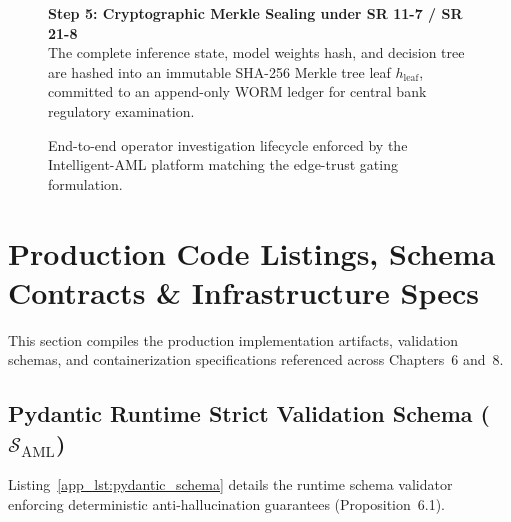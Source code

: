 \begin{figure}[htbp]
{\begin{minipage}{0.95\textwidth}
\vspace{0.25cm}
\textbf{\textcolor{blue!70!black}{Step 5: Cryptographic Merkle Sealing under SR 11-7 / SR 21-8}} \\
The complete inference state, model weights hash, and decision tree are hashed into an immutable SHA-256 Merkle tree leaf $h_{\text{leaf}}$, committed to an append-only WORM ledger for central bank regulatory examination.\par
\end{minipage}%
}
\caption[End-to-End Enterprise Operator Investigation Lifecycle]{End-to-end operator investigation lifecycle enforced by the Intelligent-AML platform matching the edge-trust gating formulation.}
\label{app_fig:workflow_lifecycle}
\end{figure}



\clearpage
\section{Production Code Listings, Schema Contracts \& Infrastructure Specs}
\label{app_sec:production_code}
This section compiles the production implementation artifacts, validation schemas, and containerization specifications referenced across Chapters~6 and~8.

\subsection{\texorpdfstring{Pydantic Runtime Strict Validation Schema ($\mathcal{S}_{\text{AML}}$)}{Pydantic Runtime Strict Validation Schema (S\_AML)}}
Listing~\ref{app_lst:pydantic_schema} details the runtime schema validator enforcing deterministic anti-hallucination guarantees (Proposition~6.1).

